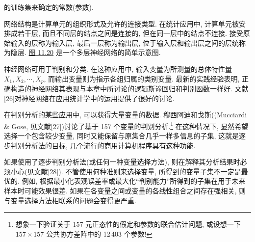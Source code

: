 
的训练集来确定的常数(参数).

网络结构是计算单元的组织形式及允许的连接类型. 在统计应用中, 计算单元被安排成若干层, 而且不同层的结点之间是连接的, 但在同一层中的结点不连接. 接受原始输入的层称为输入层, 最后一层称为输出层, 位于输入层和输出层之间的层统称为隐层. \hyperref[fig:11.20]{图 11.20} 是一个多层神经网络的简单示意图.

\begin{mvfigure}
\label{fig:11.20}
\end{mvfigure}

神经网络可用于判别和分类. 在这种应用中, 输入变量为所测量的总体特性量 $X_1,X_2,\cdots,X_p$, 而输出变量则为指示各组归属的类别变量. 最新的实践经验表明, 正确构造的神经网络其表现与本章中所讨论的逻辑斯谛回归和判别函数一样好. 文献[26]对神经网络在应用统计学中的运用提供了很好的讨论.


在判别分析的某些应用中, 可以获得大量变量的数据. 穆西阿迪和戈斯((Mucciardi \& Gose, 见文献[27])讨论了基于 157 个变量的判别分析.\footnote{想象一下验证关于 157 元正态性的假定和参数的联合估计问题, 或设想一下 $157\times 157$ 公共协方差阵中的 12\,403 个参数!} 在这种情况下, 显然希望选择一个包含较少变量, 同时又能保留与原集合几乎一样多信息的子集, 这就是逐步判别分析法的目标, 几个流行的商用计算机程序具有这种功能.

如果使用了逐步判别分析法(或任何一种变量选择方法), 则在解释其分析结果时必须小心(见文献[28]). 不管使用何种准则来选择变量, 所得到的变量子集不一定是最优的. 例如, 根据最小化表观误差率或最大化“判别能力”所得到的子集在用于未来样本时可能效果很差. 如果在各变量之间或变量的各线性组合之间存在强相关, 则与变量选择方法相联系的问题会变得更严重.

